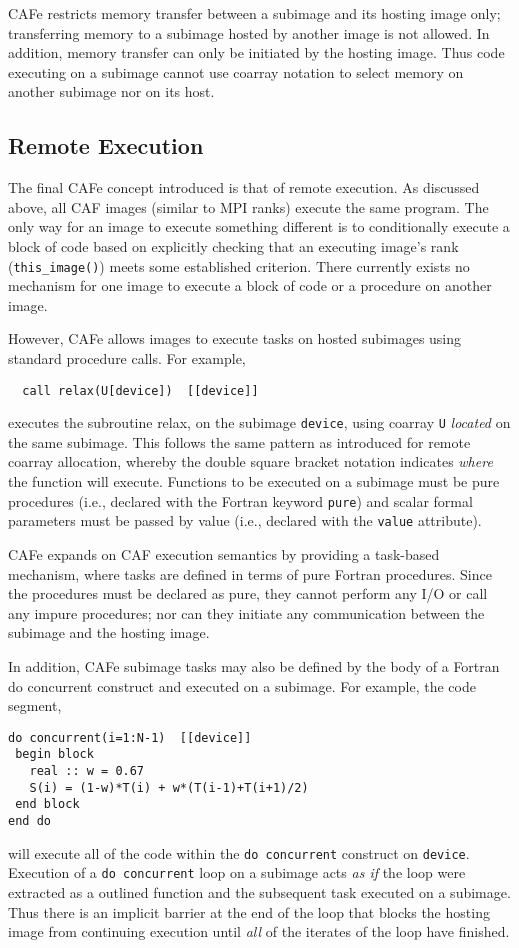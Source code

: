 CAFe restricts memory transfer between a subimage and its hosting image only; transferring
memory to a subimage hosted by another image is not allowed.  In addition, memory transfer
can only be initiated by the hosting image.  Thus code executing on a subimage cannot use
coarray notation to select memory on another subimage nor on its host.

\subsection{Remote Execution}

The final CAFe concept introduced is that of remote execution.  As discussed above,
all CAF images (similar to MPI ranks) execute the same program.  The only way for
an image to execute something different is to conditionally execute a block of code based
on explicitly checking that an executing image's rank (\texttt{this\_image()}) meets some
established criterion.  There currently exists no mechanism for one image to execute a
block of code or a procedure on another image.

However, CAFe allows images to execute tasks on hosted subimages using standard procedure
calls.  For example,
\begin{verbatim}
  call relax(U[device])  [[device]]
\end{verbatim}
executes the subroutine relax, on the subimage \texttt{device}, using coarray \texttt{U} \emph{located}
on the same subimage.  This follows the same pattern as introduced for remote coarray allocation,
whereby the double square bracket notation indicates \emph{where} the function will execute.
Functions to be executed on a subimage must be pure procedures (i.e., declared with the Fortran
keyword \texttt{pure}) and scalar formal parameters must be passed by value (i.e., declared with the
\texttt{value} attribute).

CAFe expands on CAF execution semantics by providing a task-based mechanism, where tasks
are defined in terms of pure Fortran procedures.  Since the procedures must be declared
as pure, they cannot perform any I/O or call any impure procedures; nor can they initiate
any communication between the subimage and the hosting image.

In addition, CAFe subimage tasks may also be defined by the body of a Fortran do
concurrent construct and executed on a subimage.  For example, the code segment,
\begin{verbatim}
do concurrent(i=1:N-1)  [[device]]
 begin block
   real :: w = 0.67
   S(i) = (1-w)*T(i) + w*(T(i-1)+T(i+1)/2)
 end block
end do
\end{verbatim}
will execute all of the code within the \texttt{do concurrent} construct on \texttt{device}.
Execution of a \texttt{do concurrent} loop on a subimage acts \emph{as if} the loop were
extracted as a outlined function and the subsequent task executed on a subimage.  Thus
there is an implicit barrier at the end of the loop that blocks the hosting image
from continuing execution until \emph{all} of the iterates of the loop have finished.

